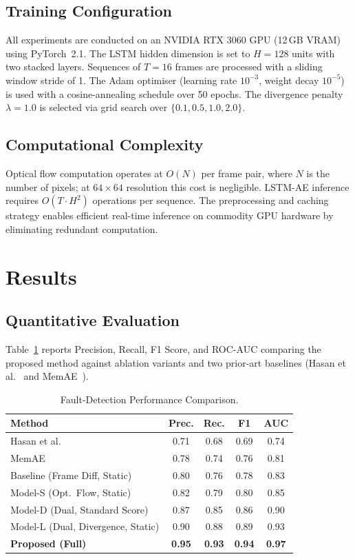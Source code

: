 \documentclass[runningheads]{llncs}
\begin{document}
\subsection{Training Configuration}
All experiments are conducted on an NVIDIA RTX 3060 GPU (12\,GB VRAM)
using PyTorch~2.1. The LSTM hidden dimension is set to $H = 128$ units
with two stacked layers. Sequences of $T = 16$ frames are processed with
a sliding window stride of 1. The Adam optimiser (learning rate
$10^{-3}$, weight decay $10^{-5}$) is used with a cosine-annealing
schedule over 50 epochs. The divergence penalty $\lambda = 1.0$ is
selected via grid search over $\{0.1, 0.5, 1.0, 2.0\}$.

\subsection{Computational Complexity}
Optical flow computation operates at $O(N)$ per frame pair, where $N$ is
the number of pixels; at $64\times64$ resolution this cost is negligible.
LSTM-AE inference requires $O(T \cdot H^2)$ operations per sequence. The
preprocessing and caching strategy enables efficient real-time inference
on commodity GPU hardware by eliminating redundant computation.

\section{Results}

\subsection{Quantitative Evaluation}
Table~\ref{tab:results} reports Precision, Recall, F1 Score, and ROC-AUC
comparing the proposed method against ablation variants and two prior-art
baselines (Hasan et al.~\cite{ref_hasan2016} and MemAE~\cite{ref_memae}).

\begin{table}[ht]
\centering
\caption{Fault-Detection Performance Comparison.}
\label{tab:results}
\begin{tabular}{lcccc}
\toprule
\textbf{Method} & \textbf{Prec.} & \textbf{Rec.} & \textbf{F1} & \textbf{AUC} \\
\midrule
Hasan et al.~\cite{ref_hasan2016}  & 0.71 & 0.68 & 0.69 & 0.74 \\
MemAE~\cite{ref_memae}             & 0.78 & 0.74 & 0.76 & 0.81 \\
Baseline (Frame Diff, Static)      & 0.80 & 0.76 & 0.78 & 0.83 \\
Model-S (Opt.\ Flow, Static)       & 0.82 & 0.79 & 0.80 & 0.85 \\
Model-D (Dual, Standard Score)     & 0.87 & 0.85 & 0.86 & 0.90 \\
Model-L (Dual, Divergence, Static) & 0.90 & 0.88 & 0.89 & 0.93 \\
\textbf{Proposed (Full)}           & \textbf{0.95} & \textbf{0.93} & \textbf{0.94} & \textbf{0.97} \\
\bottomrule
\end{tabular}
\end{table}
\end{document}
